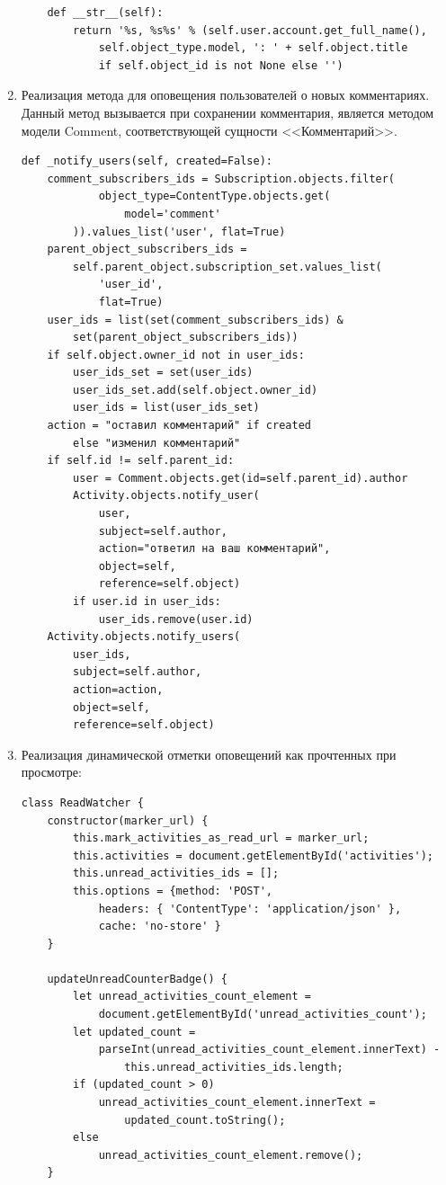\documentclass[12pt, a4paper, oneside]{article}
\begin{document}
\begin{enumerate}[wide, labelindent=0pt]
{\begin{verbatim}
    def __str__(self):
        return '%s, %s%s' % (self.user.account.get_full_name(), 
            self.object_type.model, ': ' + self.object.title 
            if self.object_id is not None else '')
        \end{verbatim}
    }
    \item {
        Реализация метода для оповещения пользователей о новых комментариях. Данный метод вызывается при сохранении комментария, является методом модели Comment, соответствующей сущности <<Комментарий>>.\label{code:comment-notification}
        \begin{verbatim}
def _notify_users(self, created=False):
    comment_subscribers_ids = Subscription.objects.filter(
            object_type=ContentType.objects.get(
                model='comment'
        )).values_list('user', flat=True)
    parent_object_subscribers_ids = 
        self.parent_object.subscription_set.values_list(
            'user_id', 
            flat=True)
    user_ids = list(set(comment_subscribers_ids) & 
        set(parent_object_subscribers_ids))
    if self.object.owner_id not in user_ids:
        user_ids_set = set(user_ids)
        user_ids_set.add(self.object.owner_id)
        user_ids = list(user_ids_set)
    action = "оставил комментарий" if created 
        else "изменил комментарий"
    if self.id != self.parent_id:
        user = Comment.objects.get(id=self.parent_id).author
        Activity.objects.notify_user(
            user, 
            subject=self.author, 
            action="ответил на ваш комментарий", 
            object=self, 
            reference=self.object)
        if user.id in user_ids:
            user_ids.remove(user.id)
    Activity.objects.notify_users(
        user_ids, 
        subject=self.author, 
        action=action, 
        object=self, 
        reference=self.object)
        \end{verbatim}
    }
    \item {
        Реализация динамической отметки оповещений как прочтенных при просмотре:\label{code:mark-activities-as-read}
        \begin{verbatim}
class ReadWatcher {
    constructor(marker_url) {
        this.mark_activities_as_read_url = marker_url;
        this.activities = document.getElementById('activities');
        this.unread_activities_ids = [];
        this.options = {method: 'POST', 
            headers: { 'ContentType': 'application/json' }, 
            cache: 'no-store' }
    }

    updateUnreadCounterBadge() {
        let unread_activities_count_element = 
            document.getElementById('unread_activities_count');
        let updated_count = 
            parseInt(unread_activities_count_element.innerText) - 
                this.unread_activities_ids.length;
        if (updated_count > 0)
            unread_activities_count_element.innerText = 
                updated_count.toString();
        else
            unread_activities_count_element.remove();
    }


\end{verbatim}}
\end{enumerate}
\end{document}
